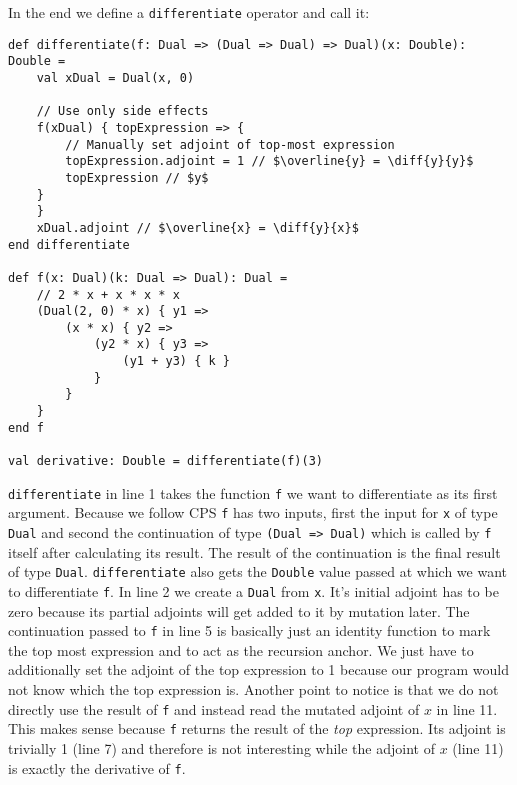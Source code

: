 In the end we define a \lstinline{differentiate} operator and call it:
\begin{lstlisting}[mathescape=true]
def differentiate(f: Dual => (Dual => Dual) => Dual)(x: Double): Double =
    val xDual = Dual(x, 0)

    // Use only side effects
    f(xDual) { topExpression => {
        // Manually set adjoint of top-most expression
        topExpression.adjoint = 1 // $\overline{y} = \diff{y}{y}$
        topExpression // $y$
    }
    }
    xDual.adjoint // $\overline{x} = \diff{y}{x}$
end differentiate

def f(x: Dual)(k: Dual => Dual): Dual =
    // 2 * x + x * x * x
    (Dual(2, 0) * x) { y1 =>
        (x * x) { y2 =>
            (y2 * x) { y3 =>
                (y1 + y3) { k }
            }
        }
    }
end f

val derivative: Double = differentiate(f)(3)
\end{lstlisting}
\lstinline{differentiate} in line 1 takes the function \lstinline{f} we want to differentiate as its first argument. Because we follow CPS \lstinline{f} has two inputs, first the input for \lstinline{x} of type \lstinline{Dual} and second the continuation of type \lstinline{(Dual => Dual)} which is called by \lstinline{f} itself after calculating its result. The result of the continuation is the final result of type \lstinline{Dual}. \lstinline{differentiate} also gets the \lstinline{Double} value passed at which we want to differentiate \lstinline{f}. In line 2 we create a \lstinline{Dual} from \lstinline{x}. It's initial adjoint has to be zero because its partial adjoints will get added to it by mutation later. The continuation passed to \lstinline{f} in line 5 is basically just an identity function to mark the top most expression and to act as the recursion anchor. We just have to additionally set the adjoint of the top expression to 1 because our program would not know which the top expression is. Another point to notice is that we do not directly use the result of \lstinline{f} and instead read the mutated adjoint of $x$ in line 11. This makes sense because \lstinline{f} returns the result of the \emph{top} expression. Its adjoint is trivially 1 (line 7) and therefore is not interesting while the adjoint of $x$ (line 11) is exactly the derivative of \lstinline{f}.

